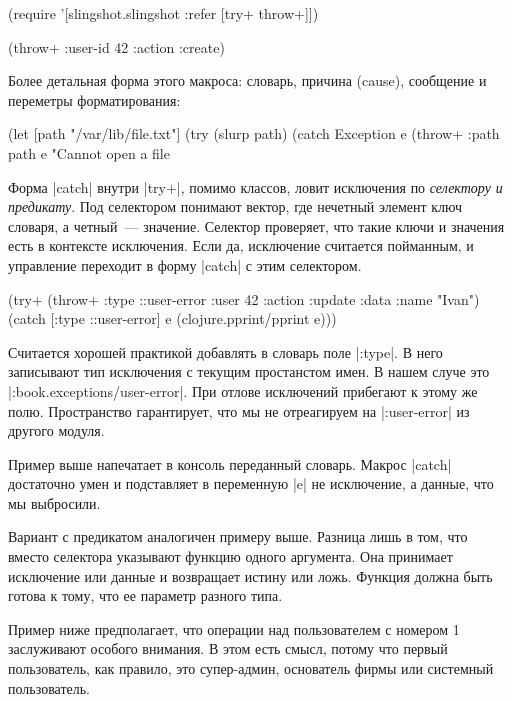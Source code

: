 \begin{code}
(require '[slingshot.slingshot
           :refer [try+ throw+]])

(throw+ {:user-id 42
         :action :create})
\end{code}

Более детальная форма этого макроса: словарь, причина (cause), сообщение и
переметры форматирования:

\begin{code}
(let [path "/var/lib/file.txt"]
  (try
    (slurp path)
    (catch Exception e
      (throw+ {:path path} e "Cannot open a file %
\end{code}

Форма \spverb|catch| внутри \spverb|try+|, помимо классов, ловит исключения по \emph{селектору и
предикату}. Под селектором понимают вектор, где нечетный элемент ключ словаря,
а четный~--- значение. Селектор проверяет, что такие ключи и значения есть в
контексте исключения. Если да, исключение считается пойманным, и управление
переходит в форму \spverb|catch| с этим селектором.

\begin{code}
(try+
 (throw+ {:type ::user-error
          :user 42
          :action :update
          :data {:name "Ivan"}})
 (catch [:type ::user-error] e
   (clojure.pprint/pprint e)))
\end{code}

Считается хорошей практикой добавлять в словарь поле \spverb|:type|. В него записывают
тип исключения с текущим простанстом имен. В нашем случе это
\spverb|:book.exceptions/user-error|. При отлове исключений прибегают к этому же
полю. Пространство гарантирует, что мы не отреагируем на \spverb|:user-error| из
другого модуля.

Пример выше напечатает в консоль переданный словарь. Макрос \spverb|catch| достаточно
умен и подставляет в переменную \spverb|e| не исключение, а данные, что мы выбросили.

Вариант с предикатом аналогичен примеру выше. Разница лишь в том, что вместо
селектора указывают функцию одного аргумента. Она принимает исключение или
данные и возвращает истину или ложь. Функция должна быть готова к тому, что ее
параметр разного типа.

Пример ниже предполагает, что операции над пользователем с номером 1 заслуживают
особого внимания. В этом есть смысл, потому что первый пользователь, как
правило, это супер-админ, основатель фирмы или системный пользователь.

